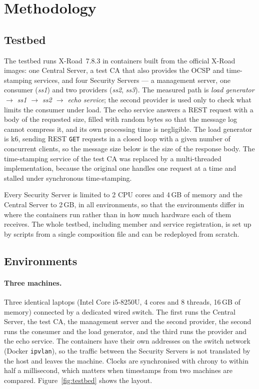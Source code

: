 \documentclass[conference,a4paper]{IEEEtran}
\begin{document}
\section{Methodology}

\subsection{Testbed}

The testbed runs X-Road~7.8.3 in containers built from the official X-Road images: one Central Server, a
test CA that also provides the OCSP and time-stamping services, and four Security Servers --- a
management server, one consumer (\emph{ss1}) and two providers (\emph{ss2}, \emph{ss3}). The measured
path is \emph{load generator $\rightarrow$ ss1 $\rightarrow$ ss2 $\rightarrow$ echo service}; the second
provider is used only to check what limits the consumer under load. The echo service answers a REST
request with a body of the requested size, filled with random bytes so that the message log cannot
compress it, and its own processing time is negligible. The load generator is k6, sending REST
\texttt{GET} requests in a closed loop with a given number of concurrent clients, so the message size
below is the size of the response body. The time-stamping service of the test CA was replaced by a
multi-threaded implementation, because the original one handles one request at a time and stalled
under synchronous time-stamping.

Every Security Server is limited to 2 CPU cores and 4\,GB of memory and the Central Server to 2\,GB,
in all environments, so that the environments differ in where the containers run rather than in how
much hardware each of them receives. The whole testbed, including member and service registration,
is set up by scripts from a single composition file and can be redeployed from scratch.

\subsection{Environments}

\paragraph{Three machines.} Three identical laptops (Intel Core i5-8250U, 4 cores and 8 threads,
16\,GB of memory) connected by a dedicated wired switch. The first runs the Central Server, the test
CA, the management server and the second provider, the second runs the consumer and the load
generator, and the third runs the provider and the echo service. The containers have their own
addresses on the switch network (Docker \texttt{ipvlan}), so the traffic between the Security
Servers is not translated by the host and leaves the machine. Clocks are synchronised with chrony to
within half a millisecond, which matters when timestamps from two machines are compared.
Figure~\ref{fig:testbed} shows the layout.
\end{document}
